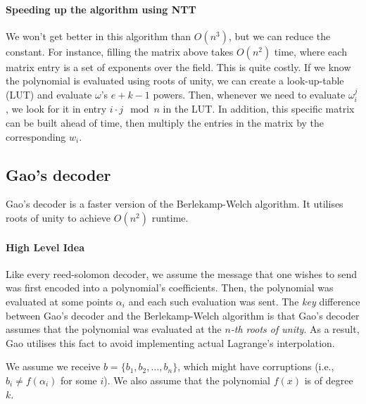 
\paragraph{Speeding up the algorithm using NTT}
We won't get better in this algorithm than $O(n^3)$, but we can reduce the constant.
For instance, filling the matrix above takes $O(n^2)$ time, where each matrix entry 
is a set of exponents over the field. This is quite costly. 
If we know the polynomial is evaluated using roots of unity, we can 
create a look-up-table (LUT) and evaluate $\omega$'s $e+k-1$ powers. 
Then, whenever we need to evaluate $\omega_i^j$, we look for it in entry $i\cdot j \mod n$ 
in the LUT.
In addition, this specific matrix can be built ahead of time, then multiply the entries in 
the matrix by the corresponding $w_i$. 


\subsection{Gao's decoder}
Gao's decoder is a faster version of the Berlekamp-Welch algorithm.
It utilises roots of unity to achieve $O(n^2)$ runtime.

\paragraph{High Level Idea}
Like every reed-solomon decoder, we assume the message that one 
wishes to send was first encoded into a polynomial's coefficients.
Then, the polynomial was evaluated at some points $\alpha_i$ and 
each such evaluation was sent.
The \emph{key} difference between Gao's decoder and the Berlekamp-Welch algorithm
is that Gao's decoder assumes that the polynomial was evaluated at
the \emph{$n$-th roots of unity}.
As a result, Gao utilises this fact to avoid implementing actual Lagrange's interpolation.


We assume we receive $b=\{b_1,b_2,\dots,b_n\}$, which might have corruptions
(i.e., $b_i\ne f(\alpha_i)$ for some $i$).
We also assume that the polynomial $f(x)$ is of degree $k$.

